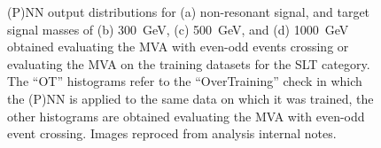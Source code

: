 \begin{figure}
    \caption{(P)NN output distributions for (a) non-resonant signal, 
    and target signal masses of (b) 300~GeV, (c) 500~GeV, 
    and (d) 1000~GeV obtained evaluating the MVA with even-odd 
    events crossing or evaluating the MVA on the training datasets for the SLT category. 
    The ``OT'' histograms refer to the ``OverTraining'' check in 
    which the (P)NN is applied to the same data on which it was trained, 
    the other histograms are obtained evaluating the MVA with even-odd event crossing.
    Images reproced from analysis internal notes.}
    \label{fig:overfittingtestSLT}
  \end{figure}
  
  \begin{figure}
    \centering
    \quad
    \quad\\
    \quad

\end{figure}

